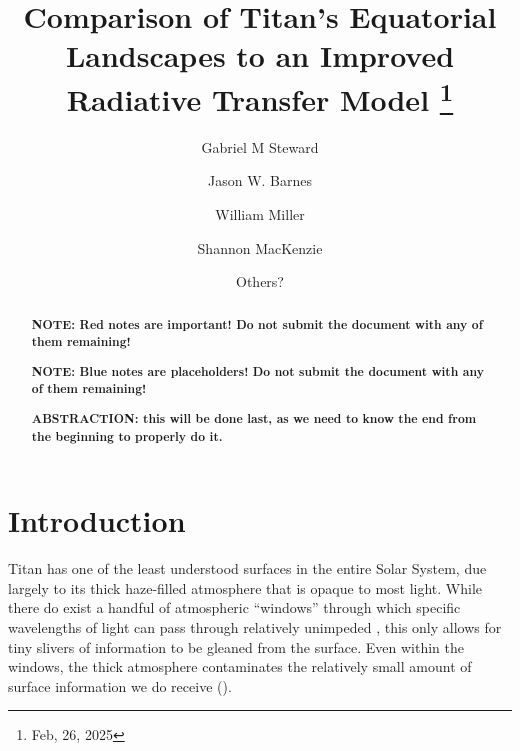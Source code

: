 \documentclass[twocolumn,linenumbers]{aastex631}
\begin{document}
\title{Comparison of Titan's Equatorial Landscapes to an Improved Radiative Transfer Model
\footnote{Feb, 26, 2025}}

\author[0000-0002-8482-4669]{Gabriel M Steward}

\author{Jason W. Barnes}

\author{William Miller}

\author{Shannon MacKenzie}

\author{Others?}

\begin{abstract}

\textbf{\color{red}NOTE: Red notes are important! Do not submit the document with any of them remaining!\color{black}}

\textbf{\color{blue}NOTE: Blue notes are placeholders! Do not submit the document with any of them remaining!\color{black}}

\textbf{\color{red}ABSTRACTION: this will be done last, as we need to know the end from the beginning to properly do it.\color{black}}

\end{abstract}


\section{Introduction} \label{sec:intro}

Titan has one of the least understood surfaces in the entire Solar System, due largely to its thick haze-filled atmosphere that is opaque to most light. While there do exist a handful of atmospheric ``windows'' through which specific wavelengths of light can pass through relatively unimpeded \citep{Barnes2007}, this only allows for tiny slivers of information to be gleaned from the surface. Even within the windows, the thick atmosphere contaminates the relatively small amount of surface information we do receive (). 
\end{document}

